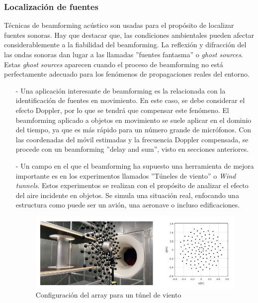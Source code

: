 \documentclass[a4paper,11pt]{book}
\begin{document}
			\subsubsection{Localización de fuentes}
			Técnicas de beamforming acústico son usadas para el propósito de localizar fuentes sonoras. Hay que destacar que, las condiciones ambientales pueden afectar considerablemente a la fiabilidad del beamforming. La reflexión y difracción del las ondas sonoras dan lugar a las llamadas ''fuentes fantasma'' o \textit{ghost sources}. Estas \textit{ghost sources} aparecen cuando el proceso de beamforming no está perfectamente adecuado para los fenómenos de propagaciones reales del entorno.
			
			
			\begin{itemize}
				\item[-] Una aplicación interesante de beamforming es la relacionada con la identificación de fuentes en movimiento. En este caso, se debe considerar el efecto Doppler, por lo que se tendrá que compensar este fenómeno. El beamforming aplicado a objetos en movimiento se suele aplicar en el dominio del tiempo, ya que es más rápido para un número grande de micrófonos. Con las coordenadas del móvil estimadas y la frecuencia Doppler compensada, se procede con un beamforming ''delay and sum'', visto en secciones anteriores.
				\item[-] Un campo en el que el beamforming ha supuesto una herramienta de mejora importante es en los experimentos llamados ''Túneles de viento'' o \textit{Wind tunnels}. Estos experimentos se realizan con el propósito de analizar el efecto del aire incidente en objetos. Se simula una situación real, enfocando una estructura como puede ser un avión, una aeronave o incluso edificaciones. 
			\begin{figure}[hbtp]
			\centering
			\includegraphics[width = 12cm]{FIGURAS/wind_tunnel.JPG}
			\caption{Configuración del array para un túnel de viento}
			\end{figure}
			

\end{itemize}
\end{document}
